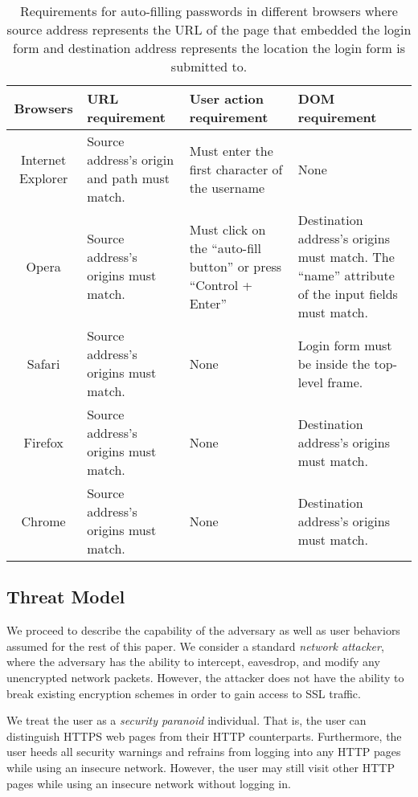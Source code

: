 \documentclass[letterpaper,twocolumn,10pt]{article}
\begin{document}
\begin{table*}
\centering
\begin{tabular}{|c|p{4cm}|p{4cm}|p{4cm}|}
\hline
\textbf{Browsers} & \textbf{URL requirement} & \textbf{User action 
requirement}& \textbf{DOM requirement}\\
\hline
Internet Explorer & Source address's origin and path must match. & Must 
enter the first character of the username & None \\
\hline
Opera & Source address's origins must match. & Must click on the ``auto-fill 
button'' or press ``Control + Enter''  &  Destination address's 
origins must match. The ``name'' attribute of the input fields must 
match.\\
\hline
Safari & Source address's origins must match.  & None & Login form must 
be inside the top-level frame.\\
\hline
Firefox &  Source address's origins must match.  & None &  Destination 
address's origins must match. \\
\hline
Chrome & Source address's origins must match.  & None &  Destination 
address's origins must match. \\
\hline
\end{tabular}
\caption{Requirements for auto-filling passwords in different 
browsers where source address represents the URL of the page that 
embedded the login form and destination address represents the 
location the login form is submitted to. }
\label{tab:browser_survey}
\end{table*}

\subsection{Threat Model}
\label{sec:threat}
We proceed to describe the capability of the adversary as well as user 
behaviors assumed for the rest of this paper. We consider a standard 
\emph{network attacker}, where the adversary has the ability to 
intercept, eavesdrop, and modify any unencrypted network packets. 
However, the attacker does not have the ability to break existing 
encryption schemes in order to gain access to SSL traffic. 

We treat the user as a \emph{security paranoid} individual. That is, 
the user can distinguish HTTPS web pages from their HTTP counterparts. 
Furthermore, the user heeds all security warnings and refrains 
from logging into any HTTP pages while using an insecure network. 
However, the user may still visit other HTTP pages while using an 
insecure network without logging in.
\end{document}
